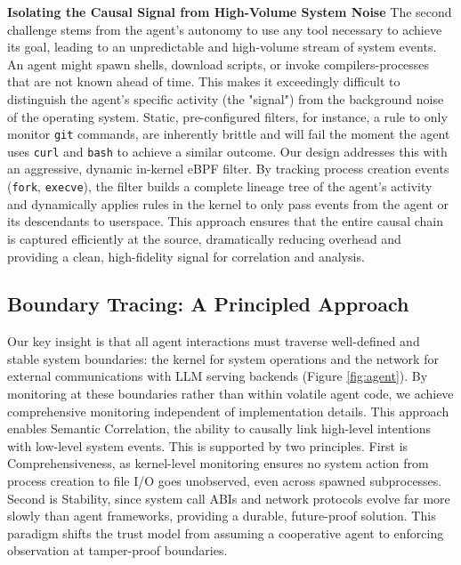\textbf{Isolating the Causal Signal from High-Volume System Noise}
The second challenge stems from the agent's autonomy to use any tool necessary to achieve its goal, leading to an unpredictable and high-volume stream of system events. An agent might spawn shells, download scripts, or invoke compilers-processes that are not known ahead of time. This makes it exceedingly difficult to distinguish the agent's specific activity (the "signal") from the background noise of the operating system. Static, pre-configured filters, for instance, a rule to only monitor \texttt{git} commands, are inherently brittle and will fail the moment the agent uses \texttt{curl} and \texttt{bash} to achieve a similar outcome. Our design addresses this with an aggressive, dynamic in-kernel eBPF filter. By tracking process creation events (\texttt{fork}, \texttt{execve}), the filter builds a complete lineage tree of the agent's activity and dynamically applies rules in the kernel to only pass events from the agent or its descendants to userspace. This approach ensures that the entire causal chain is captured efficiently at the source, dramatically reducing overhead and providing a clean, high-fidelity signal for correlation and analysis.

\subsection{Boundary Tracing: A Principled Approach}

Our key insight is that all agent interactions must traverse well-defined and stable system boundaries: the kernel for system operations and the network for external communications with LLM serving backends (Figure \ref{fig:agent}). By monitoring at these boundaries rather than within volatile agent code, we achieve comprehensive monitoring independent of implementation details. This approach enables Semantic Correlation, the ability to causally link high-level intentions with low-level system events. This is supported by two principles. First is Comprehensiveness, as kernel-level monitoring ensures no system action from process creation to file I/O goes unobserved, even across spawned subprocesses. Second is Stability, since system call ABIs and network protocols evolve far more slowly than agent frameworks, providing a durable, future-proof solution. This paradigm shifts the trust model from assuming a cooperative agent to enforcing observation at tamper-proof boundaries.

